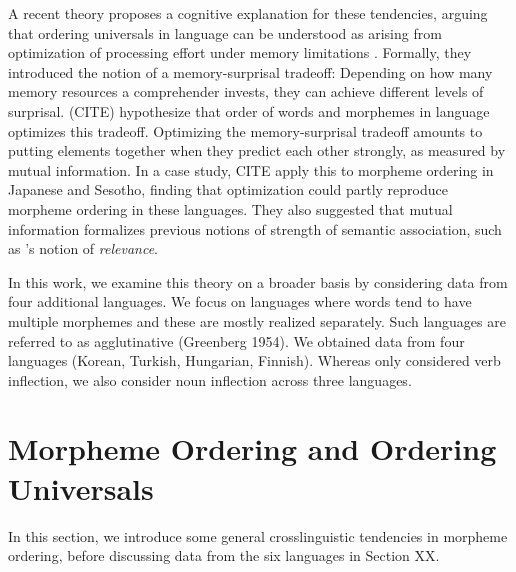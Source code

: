\documentclass[11pt,letterpaper]{article}
\begin{document}
A recent theory proposes a cognitive explanation for these tendencies, arguing that ordering universals in language can be understood as arising from optimization of processing effort under memory limitations \citep{Hahn2020modeling}.
Formally, they introduced the notion of a memory-surprisal tradeoff: Depending on how many memory resources a comprehender invests, they can achieve different levels of surprisal.
(CITE) hypothesize that order of words and morphemes in language optimizes this tradeoff.
Optimizing the memory-surprisal tradeoff amounts to putting elements together when they predict each other strongly, as measured by mutual information.
In a case study, CITE apply this to morpheme ordering in Japanese and Sesotho, finding that optimization could partly reproduce morpheme ordering in these languages.
They also suggested that mutual information formalizes previous notions of strength of semantic association, such as \cite{bybee-morphology-1985}'s notion of \textit{relevance}.


In this work, we examine this theory on a broader basis by considering data from four additional languages.
We focus on languages where words tend to have multiple morphemes and these are mostly realized separately. Such languages are referred to as agglutinative (Greenberg 1954).
We obtained data from four languages (Korean, Turkish, Hungarian, Finnish).
Whereas \cite{Hahn2020modeling} only considered verb inflection, we also consider noun inflection across three languages.









\section{Morpheme Ordering and Ordering Universals}

In this section, we introduce some general crosslinguistic tendencies in morpheme ordering, before discussing data from the six languages in Section XX.
\end{document}
